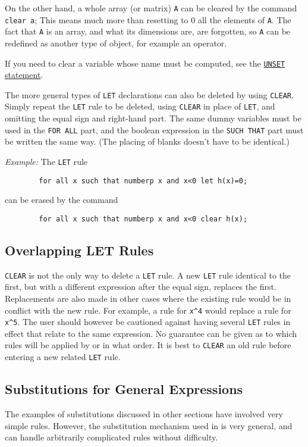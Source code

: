 On the other hand, a whole array (or matrix) \texttt{A} can be cleared by the
command \texttt{clear a};  This means much more than resetting to 0 all the
elements of \texttt{A}.  The fact that \texttt{A} is an array, and what its
dimensions are, are forgotten, so \texttt{A} can be redefined as another type
of object, for example an operator.

If you need to clear a variable whose name must be computed, see the
\hyperlink{command:UNSET}{\texttt{UNSET} statement}.

The more general types of \texttt{LET} declarations can also be deleted by
using \texttt{CLEAR}.  Simply repeat the \texttt{LET} rule to be deleted, using
\texttt{CLEAR} in place of \texttt{LET}, and omitting the equal sign and
right-hand part.  The same dummy variables must be used in the {\tt FOR
ALL} part, and the boolean expression in the \texttt{SUCH THAT} part must be
written the same way. (The placing of blanks doesn't have to be
identical.)

\textit{Example:} The \texttt{LET} rule
\begin{verbatim}
        for all x such that numberp x and x<0 let h(x)=0;
\end{verbatim}
can be erased by the command
\begin{verbatim}
        for all x such that numberp x and x<0 clear h(x);
\end{verbatim}

\subsection{Overlapping LET Rules}
\texttt{CLEAR} is not the only way to delete a \texttt{LET} rule.  A new 
\texttt{LET} rule identical to the first, but with a different expression after
the equal sign, replaces the first.  Replacements are also made in other
cases where the existing rule would be in conflict with the new rule.  For
example, a rule for \texttt{x\textasciicircum 4} would replace a rule for 
\texttt{x\textasciicircum 5}.
The user should however be cautioned against having several \texttt{LET}
rules in effect that relate to the same expression.  No guarantee can be
given as to which rules will be applied by {\REDUCE} or in what order.  It
is best to \texttt{CLEAR} an old rule before entering a new related 
\texttt{LET} rule.

\subsection{Substitutions for General Expressions}
\label{sec-gensubs}
The examples of substitutions discussed in other sections have involved
very simple rules. However, the substitution mechanism used in {\REDUCE} is
very general, and can handle arbitrarily complicated rules without
difficulty.

